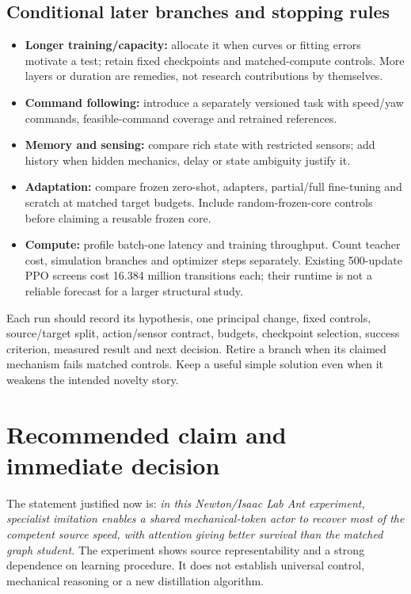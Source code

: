 \documentclass[11pt,letterpaper]{article}
\begin{document}
\subsection{Conditional later branches and stopping rules}
\begin{itemize}
\item \textbf{Longer training/capacity:} allocate it when curves or fitting errors
motivate a test; retain fixed checkpoints and matched-compute controls. More
layers or duration are remedies, not research contributions by themselves.
\item \textbf{Command following:} introduce a separately versioned task with
speed/yaw commands, feasible-command coverage and retrained references.
\item \textbf{Memory and sensing:} compare rich state with restricted sensors;
add history when hidden mechanics, delay or state ambiguity justify it.
\item \textbf{Adaptation:} compare frozen zero-shot, adapters, partial/full
fine-tuning and scratch at matched target budgets. Include random-frozen-core
controls before claiming a reusable frozen core.
\item \textbf{Compute:} profile batch-one latency and training throughput. Count
teacher cost, simulation branches and optimizer steps separately. Existing
500-update PPO screens cost 16.384 million transitions each; their runtime is not
a reliable forecast for a larger structural study.
\end{itemize}

Each run should record its hypothesis, one principal change, fixed controls,
source/target split, action/sensor contract, budgets, checkpoint selection,
success criterion, measured result and next decision. Retire a branch when its
claimed mechanism fails matched controls. Keep a useful simple solution even
when it weakens the intended novelty story.

\section{Recommended claim and immediate decision}
\label{sec:decision}

The statement justified now is: \emph{in this Newton/Isaac Lab Ant experiment,
specialist imitation enables a shared mechanical-token actor to recover most of
the competent source speed, with attention giving better survival than the
matched graph student.} The experiment shows source representability and a strong
dependence on learning procedure. It does not establish universal control,
mechanical reasoning or a new distillation algorithm.
\end{document}
